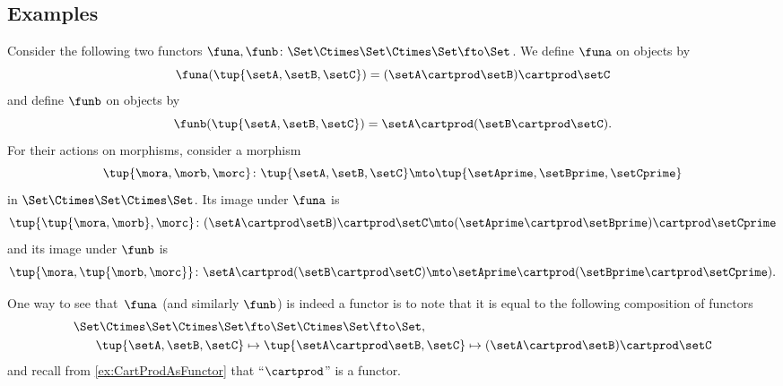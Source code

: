 \begin{figure}[h]
    \centering
    \begin{ctdefinitionshade}
        \small
    \end{ctdefinitionshade}
    \caption{}
    \label{fig:nat_trans_graphically}
\end{figure}


\subsection{Examples}

\begin{example}
    Consider the following two functors $\funa, \funb \colon \Set \Ctimes \Set \Ctimes \Set \fto \Set$.
    We define $\funa$ on objects by
    \begin{equation}
        \funa(\tup{\setA, \setB, \setC}) = (\setA \cartprod \setB) \cartprod \setC
    \end{equation}
    and define $\funb$ on objects by
    \begin{equation}
        \funb(\tup{\setA, \setB, \setC}) = \setA \cartprod (\setB \cartprod \setC).
    \end{equation}
    For their actions on morphisms, consider a morphism
    \begin{equation}
        \tup{\mora, \morb, \morc} \colon \tup{\setA, \setB, \setC} \mto \tup{\setAprime, \setBprime, \setCprime}
    \end{equation}
    in $\Set \Ctimes \Set \Ctimes \Set$.
    Its image under $\funa$ is
    \begin{equation}
        \tup{\tup{\mora, \morb}, \morc} \colon (\setA \cartprod \setB) \cartprod \setC \mto (\setAprime \cartprod \setBprime) \cartprod \setCprime
    \end{equation}
    and its image under $\funb$ is
    \begin{equation}
        \tup{\mora, \tup{\morb, \morc}} \colon \setA \cartprod (\setB \cartprod \setC) \mto \setAprime \cartprod (\setBprime \cartprod \setCprime).
    \end{equation}

    One way to see that~$\funa$ (and similarly $\funb$) is indeed a functor is to note that it is equal to the following composition of functors
    \begin{equation}
        \begin{aligned}
            \Set \Ctimes \Set \Ctimes \Set & \fto \Set \Ctimes \Set \fto \Set, \\
            \tup{\setA, \setB, \setC}      & \mapsto \tup{\setA \cartprod \setB, \setC} \mapsto (\setA \cartprod \setB) \cartprod \setC
        \end{aligned}
    \end{equation}
    and recall from \cref{ex:CartProdAsFunctor} that ``$\cartprod$'' is a functor.


\end{example}
